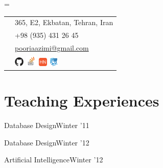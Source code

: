\documentclass{tccv}
\begin{document}
{{\needspace{0.5\textheight}%
    \newdimen\boxwidth%
    \boxwidth=\dimexpr{}\fboxsep\relax%
    \colorbox[HTML]{BEDBE3}{%
    \begin{tabularx}{\boxwidth}{c|X}
	    \Writinghand & 
	    {365, E2, Ekbatan, Tehran, Iran}\smallskip\\
	    \Telefon     & 
	    {+98 (935) 431 26 45}\smallskip\\
	    \Letter      & 
	    \href{mailto:pooriaazimi@gmail.com}{pooriaazimi@gmail.com}
	    \\[3pt]
	     & 
		\href{https://github.com/pooriaazimi/}{\includegraphics[width=13pt]{Logos/Github.pdf}}
		\href{http://stackoverflow.com/users/347353/pooria-azimi}{\includegraphics[width=15pt]{Logos/StackOverflow.pdf}}
		\href{https://news.ycombinator.com/user?id=pooriaazimi}{\includegraphics[width=12pt]{Logos/HN.pdf}}
		\href{http://forum.irmug.com}{\includegraphics[width=13pt]{Logos/IRMUG.pdf}}
	\end{tabularx}}
	





\vspace{8pt}











\section{Teaching Experiences}

\begin{ta}

\item{Database Design}{Winter '11}

\item{Database Design}{Winter '12}

\item{Artificial Intelligence}{Winter '12}


\end{ta}}}
\end{document}
